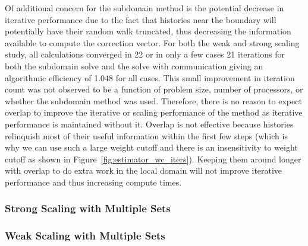 Of additional concern for the subdomain method is the potential
decrease in iterative performance due to the fact that histories near
the boundary will potentially have their random walk truncated, thus
decreasing the information available to compute the correction
vector. For both the weak and strong scaling study, all calculations
converged in 22 or in only a few cases 21 iterations for both the
subdomain solve and the solve with communication giving an algorithmic
efficiency of 1.048 for all cases. This small improvement in iteration
count was not observed to be a function of problem size, number of
processors, or whether the subdomain method was used. Therefore, there
is no reason to expect overlap to improve the iterative or scaling
performance of the method as iterative performance is maintained
without it. Overlap is not effective because histories relinquish most
of their useful information within the first few steps (which is why
we can use such a large weight cutoff and there is an insensitivity to
weight cutoff as shown in
Figure~\ref{fig:estimator_wc_iters}). Keeping them around longer with
overlap to do extra work in the local domain will not improve
iterative performance and thus increasing compute times.

\clearpage

\subsubsection{Strong Scaling with Multiple Sets}
\label{subsubsec:subdomain_ms_strong}

\clearpage

\subsubsection{Weak Scaling with Multiple Sets}
\label{subsubsec:subdomain_ms_weak}

